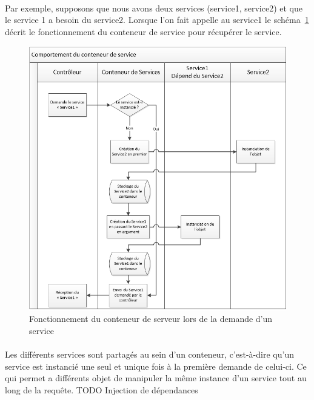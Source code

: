 \paragraph{}
Par exemple, supposons que nous avons deux services (service1, service2) et que le service 1 a besoin du service2. Lorsque l'on fait appelle au service1 le schéma~\ref{conteneur} décrit le fonctionnement du conteneur de service pour récupérer le service.
		\begin{figure}[H]
        \begin{center}
          \includegraphics[scale=0.8]{images/conteneur_service}
        \end{center}
        \caption{Fonctionnement du conteneur de serveur lors de la demande d'un service}
        \label{conteneur}
      \end{figure}

\paragraph{}
Les différents services sont partagés au sein d'un conteneur, c'est-à-dire qu'un service est instancié une seul et unique fois à la première demande de celui-ci. Ce qui permet a  différents objet de manipuler la même instance d'un service tout au long de la requête.
TODO Injection de dépendances